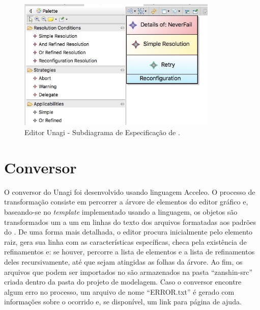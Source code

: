 \begin{figure}
	\centering
	\includegraphics[width=0.85\textwidth]{figuras/unagi/unagisubdiagrama.jpg}
	\caption{Editor Unagi - Subdiagrama de Especificação de \evoreqs.}
	\label{figura-subdiagrama-awreq}
\end{figure}

\section{Conversor}
\label{sec-unagi-conversor}

O conversor do Unagi foi desenvolvido usando linguagem Acceleo. O processo de transformação consiste em percorrer a árvore de elementos do editor gráfico e, baseando-se no \textit{template} implementado usando a linguagem, os objetos são transformados um a um em linhas do texto dos arquivos \xml formatadas aos padrões do \zanshin. De uma forma mais detalhada, o editor procura inicialmente pelo elemento raiz, gera sua linha com as características específicas, checa pela existência de refinamentos e: se houver, percorre a lista de elementos e a lista de refinamentos deles recursivamente, até que sejam atingidas as folhas da árvore. Ao fim, os arquivos que podem ser importados no \zanshin são armazenados na pasta ``zanshin-src'' criada dentro da pasta do projeto de modelagem. Caso o conversor encontre algum erro no processo, um arquivo de nome ``ERROR.txt'' é gerado com informações sobre o ocorrido e, se disponível, um link para página de ajuda.